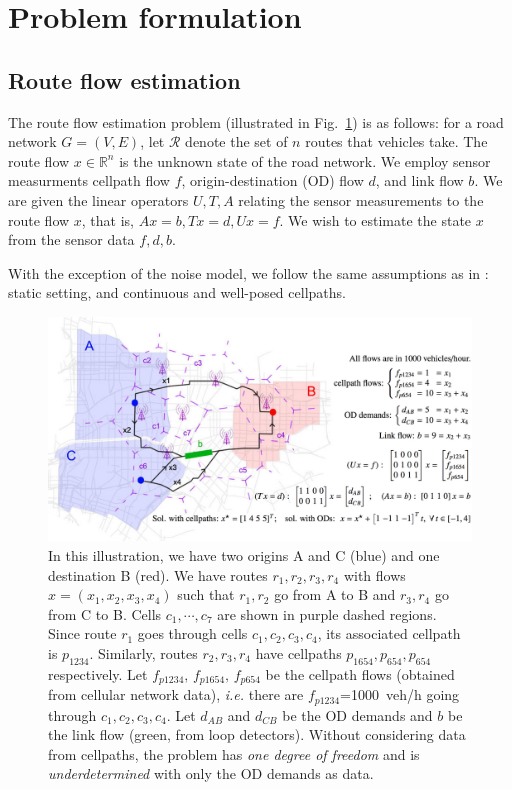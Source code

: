 
\section{Problem formulation}
\label{sec:system-model}

\subsection{Route flow estimation}
The route flow estimation problem (illustrated in Fig.~\ref{fig:example-setup}) is as follows: for a road network $G=(V,E)$, let $\mathcal{R}$ denote the set of $n$ routes that vehicles take.  The route flow $x \in \mathbb{R}^n$ is the unknown state of the road network.  We employ sensor measurments cellpath flow $f$, origin-destination (OD) flow $d$, and link flow $b$.  We are given the linear operators $U, T, A$ relating the sensor measurements to the route flow $x$, that is, $Ax=b, Tx=d, Ux=f$. We wish to estimate the state $x$ from the sensor data $f,d,b$.

With the exception of the noise model, we follow the same assumptions as in \cite{Wu2015}: static setting, and continuous and well-posed cellpaths.

\begin{figure}[htb]
  \centering
    \includegraphics[width=0.47	\textwidth]{figures/setup}
  \caption{\footnotesize{In this illustration, we have two origins A and C ({\color{blue}blue}) and one destination B ({\color{red}red}). We have routes $r_1,r_2,r_3,r_4$ with flows $x=(x_1,x_2,x_3, x_4)$ such that $r_1,r_2$ go from A to B and $r_3,r_4$ go from C to B. Cells $c_1,\cdots,c_7$ are shown in {\color{magenta} purple} dashed regions. Since route $r_1$ goes through cells $c_1,c_2,c_3,c_4$, its associated cellpath is $p_{1234}$. Similarly, routes $r_2,r_3,r_4$ have cellpaths $p_{1654},p_{654},p_{654}$ respectively. Let $f_{p1234},\,f_{p1654},\,f_{p654}$ be the cellpath flows (obtained from cellular network data), \emph{i.e.} there are $f_{p1234}$=1000~veh/h going through $c_1,c_2,c_3,c_4$. Let $d_{AB}$ and $d_{CB}$ be the OD demands and $b$ be the link flow ({\color{green}green}, from loop detectors). Without considering data from cellpaths, the problem has \emph{one degree of freedom} and is \emph{underdetermined} with only the OD demands as data.}}
  \label{fig:example-setup}
\end{figure}

